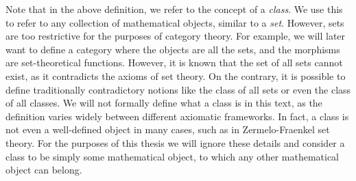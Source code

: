 \documentclass[../thesis.tex]{subfiles}
\begin{document}
Note that in the above definition, we refer to the concept of a \textit{class}.
We use this to refer to any collection of mathematical objects, similar to a \textit{set}.
However, sets are too restrictive for the purposes of category theory.
For example, we will later want to define a category where the objects are all the sets, and the morphisms are set-theoretical functions.
However, it is known that the set of all sets cannot exist, as it contradicts the axioms of set theory.
On the contrary, it is possible to define traditionally contradictory notions like the class of all sets or even the class of all classes.
We will not formally define what a class is in this text, as the definition varies widely between different axiomatic frameworks.
In fact, a class is not even a well-defined object in many cases, such as in Zermelo-Fraenkel set theory.
For the purposes of this thesis we will ignore these details and consider a class to be simply some mathematical object, to which any other mathematical object can belong.
\end{document}
